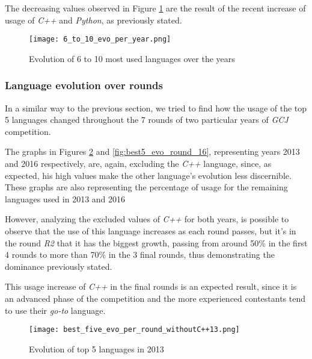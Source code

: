 \documentclass{article}
\begin{document}
\begin{multicols*}{2}
The decreasing values observed in Figure \ref{fig:6_to_10_evo} are the result of the recent increase of usage of \textit{C++} and \textit{Python}, as previously stated.


\begin{figure}[H]
    \centering
    \texttt{[image: 6\_to\_10\_evo\_per\_year.png]}
    \caption{Evolution of 6 to 10 most used languages over the years}
    \label{fig:6_to_10_evo}
\end{figure}


\subsubsection{Language evolution over rounds}

In a similar way to the previous section, we tried to find how the usage of the top 5 languages changed throughout the 7 rounds of two particular years of \textit{GCJ} competition.

The graphs in Figures \ref{fig:best5_evo_round_13} and \ref{fig:best5_evo_round_16}, representing years 2013 and 2016 respectively, are, again, excluding the \textit{C++} language, since, as expected, his high values make the other language's evolution less discernible.
These graphs are also representing the percentage of usage for the remaining languages used in 2013 and 2016

However, analyzing the excluded values of \textit{C++} for both years, is possible to observe that the use of this language increases as each round passes, but it's in the round \textit{R2} that it has the biggest growth, passing from around 50\% in the first 4 rounds to more than 70\% in the 3 final rounds, thus demonstrating the dominance previously stated.

This usage increase of \textit{C++} in the final rounds is an expected result, since it is an advanced phase of the competition and the more experienced contestants tend to use their \textit{go-to} language.


\begin{figure}[H]
    \centering
    \texttt{[image: best\_five\_evo\_per\_round\_withoutC++13.png]}
    \caption{Evolution of top 5 languages in 2013}
    \label{fig:best5_evo_round_13}
\end{figure}


\end{multicols*}
\end{document}
